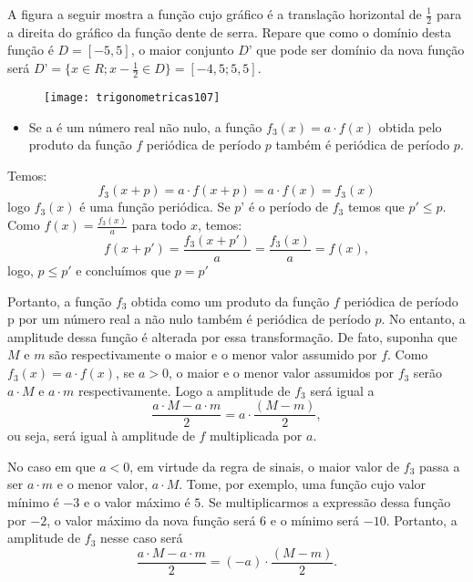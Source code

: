A figura a seguir mostra a função cujo gráfico é a translação horizontal de $\frac{1}{2}$ para a direita do gráfico da função dente de serra. Repare que como o domínio desta função é $D = [-5,5]$, o maior conjunto $D’$ que pode ser domínio da nova função será $D’ =\{x\in R;x-\frac{1}{2}\in D\}= [-4{,}5; 5{,}5]$.

\begin{figure}[H]
\centering

\texttt{[image: trigonometricas107]}
\end{figure}

\begin{itemize}
\item 	Se a é um número real não nulo, a função $f_3(x) = a\cdot f(x)$ obtida pelo produto da função $f$ periódica de período $p$ também é periódica de período $p$.
\end{itemize}

Temos:
\begin{equation*}
f_3(x+p)=a\cdot f(x+p)=a\cdot f(x)=f_3(x)
\end{equation*}
logo $f_3(x)$ é uma função periódica. Se $p’$ é o período de $f_3$ temos que $p'\leq p$. Como $f(x) = \frac{f_3 (x)}{a}$ para todo $x$, temos:
\begin{equation*}
f(x+p')=\frac{f_3(x+p')}{a}=\frac{f_3(x)}{a}=f(x),
\end{equation*}
logo, $p\leq p'$ e concluímos que $p=p'$

Portanto, a função $f_3$ obtida como um produto da função $f$ periódica de período p por um número real a não nulo também é periódica de período $p$. No entanto, a amplitude dessa função é alterada por essa transformação. De fato, suponha que $M$ e $m$ são respectivamente o maior e o menor valor assumido por $f$. Como $f_3(x) = a\cdot f(x)$, se $a > 0$, o maior e o menor valor assumidos por $f_3$ serão $a\cdot M$ e  $a\cdot m$ respectivamente. Logo a amplitude de $f_3$ será igual a 
\begin{equation*}
\frac{a\cdot M-a\cdot m}{2}=a\cdot\frac{(M-m)}{2},
\end{equation*}
ou seja, será igual à amplitude de $f$ multiplicada por $a$.

No caso em que $a < 0$, em virtude da regra de sinais, o maior valor de $f_3$ passa a ser $a\cdot m$  e o menor valor, $a\cdot M$. Tome, por exemplo, uma função cujo valor mínimo é $-3$ e o valor máximo é $5$. Se multiplicarmos a expressão dessa função por $-2$, o valor máximo da nova função será $6$ e o mínimo será $-10$. Portanto, a amplitude de $f_3$ nesse caso será 
\begin{equation*}
\frac{a\cdot M-a\cdot m}{2}=(-a)\cdot\frac{(M-m)}{2}.
\end{equation*}

